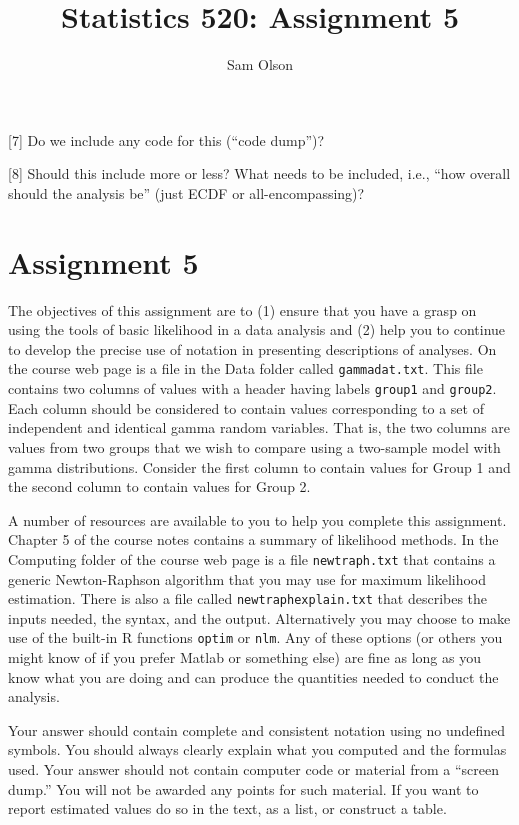 \documentclass[
]{article}
\title{Statistics 520: Assignment 5}
\author{Sam Olson}
\date{}
\begin{document}
\maketitle

{[}7{]} Do we include any code for this (``code dump'')?

{[}8{]} Should this include more or less? What needs to be included,
i.e., ``how overall should the analysis be'' (just ECDF or
all-encompassing)?

\section{Assignment 5}\label{assignment-5}

The objectives of this assignment are to (1) ensure that you have a
grasp on using the tools of basic likelihood in a data analysis and (2)
help you to continue to develop the precise use of notation in
presenting descriptions of analyses. On the course web page is a file in
the Data folder called \texttt{gammadat.txt}. This file contains two
columns of values with a header having labels \texttt{group1} and
\texttt{group2}. Each column should be considered to contain values
corresponding to a set of independent and identical gamma random
variables. That is, the two columns are values from two groups that we
wish to compare using a two-sample model with gamma distributions.
Consider the first column to contain values for Group 1 and the second
column to contain values for Group 2.

A number of resources are available to you to help you complete this
assignment. Chapter 5 of the course notes contains a summary of
likelihood methods. In the Computing folder of the course web page is a
file \texttt{newtraph.txt} that contains a generic Newton-Raphson
algorithm that you may use for maximum likelihood estimation. There is
also a file called \texttt{newtraphexplain.txt} that describes the
inputs needed, the syntax, and the output. Alternatively you may choose
to make use of the built-in R functions \texttt{optim} or \texttt{nlm}.
Any of these options (or others you might know of if you prefer Matlab
or something else) are fine as long as you know what you are doing and
can produce the quantities needed to conduct the analysis.

Your answer should contain complete and consistent notation using no
undefined symbols. You should always clearly explain what you computed
and the formulas used. Your answer should not contain computer code or
material from a ``screen dump.'' You will not be awarded any points for
such material. If you want to report estimated values do so in the text,
as a list, or construct a table.
\end{document}
